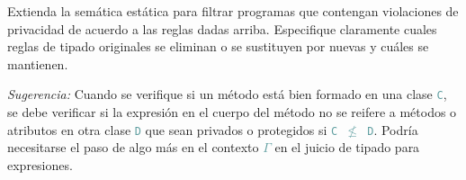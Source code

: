 \documentclass{article}
\newcommand{\tx}[1]{\textcolor{CadetBlue} {\texttt{#1}}}
\newcommand{\ti}[1]{\textcolor{RoyalPurple} {\textit{#1}}}
\begin{document}
\begin{enumerate}
        Extienda la semática estática para filtrar programas que contengan 
        violaciones de privacidad de acuerdo a las reglas dadas arriba. 
        Especifique claramente cuales reglas de tipado originales se eliminan o 
        se sustituyen por nuevas y cuáles se mantienen.

        \ti{Sugerencia:} Cuando se verifique si un método está bien formado en 
        una clase \tx{C}, se debe verificar si la expresión en el cuerpo del 
        método no se reifere a métodos o atributos en otra clase \tx{D} que sean
        privados o protegidos si \tx{C $\not \leq$ D}. Podría necesitarse el 
        paso de algo más en el contexto \tx{$\Gamma$} en el juicio de tipado 
        para expresiones.

    \end{enumerate}
\end{document}
